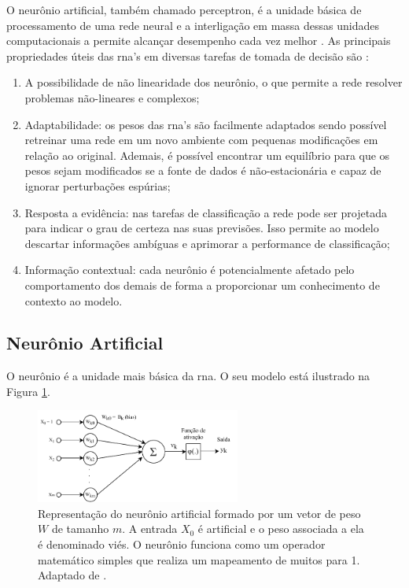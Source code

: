 O neurônio artificial, também chamado perceptron, é a unidade básica de processamento de uma rede neural e a interligação em massa dessas unidades computacionais a permite alcançar desempenho cada vez melhor \cite{Haykin}.  As principais propriedades úteis das \acrshort{rna}'s em diversas tarefas de tomada de decisão são \cite{Haykin}:
\begin{enumerate}
	\item A possibilidade de não linearidade dos neurônio, o que permite a rede resolver problemas não-lineares e complexos;
	\item  Adaptabilidade: os pesos das \acrshort{rna}'s são facilmente adaptados sendo possível retreinar uma rede em um novo ambiente com pequenas modificações em relação ao original. Ademais, é possível encontrar um equilíbrio para que os pesos sejam modificados se a fonte de dados é não-estacionária e capaz de ignorar perturbações espúrias;
	\item Resposta a evidência: nas tarefas de classificação a rede pode ser projetada para indicar o grau de certeza nas suas previsões. Isso permite ao modelo descartar informações ambíguas e aprimorar a performance de classificação;
	\item Informação contextual: cada neurônio é potencialmente afetado pelo comportamento dos demais de forma a proporcionar um conhecimento de contexto ao modelo.
\end{enumerate}



\subsection{Neurônio Artificial}
O neurônio é a unidade mais básica da \acrshort{rna}. O seu modelo está ilustrado na Figura \ref{fig:neuronio}.

\begin{figure}[h]
	\centering
	\includegraphics[width=0.6\textwidth]{figuras/neuronio.pdf}
	\caption[Modelo do neurônio matemático.]{Representação do neurônio artificial formado por um vetor de peso $W$ de tamanho $m$. A entrada $X_0$ é artificial e o peso associada a ela é denominado viés. O neurônio funciona como um operador matemático simples que realiza um mapeamento de muitos para 1. Adaptado de \cite{Haykin}.}
	\label{fig:neuronio}
\end{figure}

